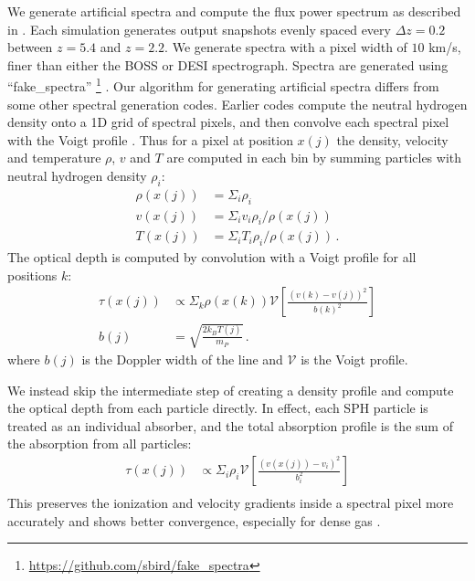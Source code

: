 \documentclass[a4paper,11pt]{article}
\newcommand{\Lya}{Lyman-$\alpha$}
\begin{document}
We generate artificial spectra and compute the flux power spectrum as described in \cite{Bird:2019}. Each simulation generates output snapshots evenly spaced every $\Delta z = 0.2$ between $z = 5.4$ and $z = 2.2$. We generate spectra with a pixel width of $10$ km/s, finer than either the BOSS or DESI spectrograph. Spectra are generated using ``fake\_spectra'' \footnote{\url{https://github.com/sbird/fake_spectra}} \cite{FSFE:2017}. Our algorithm for generating artificial spectra differs from some other spectral generation codes. Earlier codes compute the neutral hydrogen density onto a 1D grid of spectral pixels, and then convolve each spectral pixel with the Voigt profile \cite[e.g.~]{Theuns:1998, Chabanier:2022}. Thus for a pixel at position $x(j)$ the density, velocity and temperature $\rho$, $v$ and $T$ are computed in each bin by summing particles with neutral hydrogen density $\rho_i$:
\begin{align}
 \rho(x(j)) &= \Sigma_i \rho_i \\
 v(x(j)) &= \Sigma_i v_i \rho_i / \rho(x(j)) \\
 T(x(j)) &= \Sigma_i T_i \rho_i / \rho(x(j))\,.
\end{align}
The optical depth is computed by convolution with a Voigt profile for all positions $k$:
\begin{align}
 \tau(x(j)) &\propto \Sigma_k \rho(x(k)) \mathcal{V}\left[\frac{(v(k) - v(j))^2}{b(k)^2}\right] \\
 b(j) &= \sqrt{\frac{2 k_B T(j)}{m_P}}\,.
\end{align}
where $b(j)$ is the Doppler width of the line and $\mathcal{V}$ is the Voigt profile.

We instead skip the intermediate step of creating a density profile and compute the optical depth from each particle directly. In effect, each SPH particle is treated as an individual absorber, and the total absorption profile is the sum of the absorption from all particles:
\begin{align}
 \tau(x(j)) &\propto \Sigma_i \rho_i \mathcal{V}\left[\frac{(v(x(j)) - v_i)^2}{b_i^2}\right] \\
\end{align}
This preserves the ionization and velocity gradients inside a spectral pixel more accurately and shows better convergence, especially for dense gas \cite{Bird:2015}.

\end{document}
